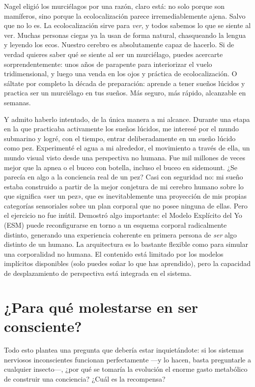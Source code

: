 \documentclass[11pt, twoside, openright]{book}
\begin{document}
Nagel eligió los murciélagos por una razón, claro está: no solo porque son mamíferos, sino porque la ecolocalización parece irremediablemente ajena. Salvo que no lo es. La ecolocalización sirve para \textit{ver}, y todos sabemos lo que se siente al ver. Muchas personas ciegas ya la usan de forma natural, chasqueando la lengua y leyendo los ecos. Nuestro cerebro es absolutamente capaz de hacerlo. Si de verdad quieres saber qué se siente al ser un murciélago, puedes acercarte sorprendentemente: unos años de parapente para interiorizar el vuelo tridimensional, y luego una venda en los ojos y práctica de ecolocalización. O sáltate por completo la década de preparación: aprende a tener sueños lúcidos y practica ser un murciélago en tus sueños. Más seguro, más rápido, alcanzable en semanas.

Y admito haberlo intentado, de la única manera a mi alcance. Durante una etapa en la que practicaba activamente los sueños lúcidos, me interesé por el mundo submarino y logré, con el tiempo, entrar deliberadamente en un sueño lúcido como pez. Experimenté el agua a mi alrededor, el movimiento a través de ella, un mundo visual visto desde una perspectiva no humana. Fue mil millones de veces mejor que la apnea o el buceo con botella, incluso el buceo en sidemount. ¿Se parecía en algo a la conciencia real de un pez? Casi con seguridad no: mi sueño estaba construido a partir de la mejor conjetura de mi cerebro humano sobre lo que significa «ser un pez», que es inevitablemente una proyección de mis propias categorías sensoriales sobre un plan corporal que no posee ninguna de ellas. Pero el ejercicio no fue inútil. Demostró algo importante: el Modelo Explícito del Yo (ESM) puede reconfigurarse en torno a un esquema corporal radicalmente distinto, generando una experiencia coherente en primera persona de \textit{ser} algo distinto de un humano. La arquitectura es lo bastante flexible como para simular una corporalidad no humana. El contenido está limitado por los modelos implícitos disponibles (solo puedes soñar lo que has aprendido), pero la capacidad de desplazamiento de perspectiva está integrada en el sistema.

\section*{¿Para qué molestarse en ser consciente?}

Todo esto plantea una pregunta que debería estar inquietándote: si los sistemas nerviosos inconscientes funcionan perfectamente ---y lo hacen, basta preguntarle a cualquier insecto---, ¿por qué se tomaría la evolución el enorme gasto metabólico de construir una conciencia? ¿Cuál es la recompensa?
\end{document}
